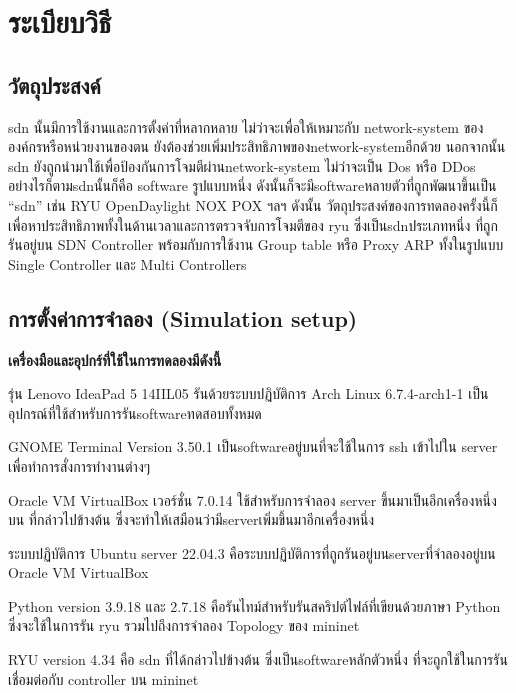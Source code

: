 \section{ระเบียบวิธี} 

\subsection{วัตถุประสงค์}  
\indent\indent
\gls{sdn} นั้นมีการใช้งานและการตั้งค่าที่หลากหลาย
ไม่ว่าจะเพื่อให้เหมาะกับ \gls{network-system} ขององค์กรหรือหน่วยงานของตน ยังต้องช่วยเพิ่มประสิทธิภาพของ\gls{network-system}อีกด้วย
นอกจากนั้น \gls{sdn} ยังถูกนำมาใช้เพื่อป้องกันการโจมตีผ่าน\gls{network-system} ไม่ว่าจะเป็น Dos หรือ DDos
อย่างไรก็ตาม\gls{sdn}นั้นก็คือ \gls{software} รูปแบบหนึ่ง
ดังนั้นก็จะมี\gls{software}หลายตัวที่ถูกพัฒนาขึ้นเป็น ``\gls{sdn}'' เช่น RYU OpenDaylight NOX POX ฯลฯ 
ดังนั้น
วัตถุประสงค์ของการทดลองครั้งนี้ก็เพื่อหาประสิทธิภาพทั้งในด้านเวลาและการตรวจจับการโจมตีของ \gls{ryu} ซึ่งเป็น\gls{sdn}ประเภทหนึ่ง ที่ถูกรันอยู่บน SDN Controller
พร้อมกับการใช้งาน Group table หรือ Proxy ARP ทั้งในรูปแบบ Single Controller และ Multi Controllers
\\
\subsection{การตั้งค่าการจำลอง (Simulation setup)}

\textbf{เครื่องมือและอุปกร์ที่ใช้ในการทดลองมีดังนี้} 

\notebook รุ่น Lenovo IdeaPad 5 14IIL05 รันด้วยระบบปฏิบัติการ Arch Linux 6.7.4-arch1-1 
เป็นอุปกรณ์ที่ใช้สำหรับการรัน\gls{software}ทดสอบทั้งหมด

GNOME Terminal Version 3.50.1 
เป็น\gls{software}อยู่บน\notebook ที่จะใช้ในการ ssh เข้าไปใน server เพื่อทำการสั่งการทำงานต่างๆ

Oracle VM VirtualBox เวอร์ชั่น 7.0.14 
ใช้สำหรับการจำลอง \gls{server} ขึ้นมาเป็นอีกเครื่องหนึ่งบน\notebook
ที่กล่าวไปข้างต้น ซึ่งจะทำให้เสมือนว่ามี\gls{server}เพิ่มขึ้นมาอีกเครื่องหนึ่ง

ระบบปฏิบัติการ Ubuntu server 22.04.3
คือระบบปฏิบัติการที่ถูกรันอยู่บน\gls{server}ที่จำลองอยู่บน Oracle VM VirtualBox 

Python version 3.9.18 และ 2.7.18 
คือรันไทม์สำหรับรันสคริปต์ไฟล์ที่เขียนด้วยภาษา Python ซึ่งจะใช้ในการรัน \gls{ryu} รวมไปถึงการจำลอง Topology ของ mininet

RYU version 4.34
คือ \gls{sdn} ที่ได้กล่าวไปข้างต้น ซึ่งเป็น\gls{software}หลักตัวหนึ่ง ที่จะถูกใช้ในการรันเชื่อมต่อกับ \gls{controller} บน mininet

